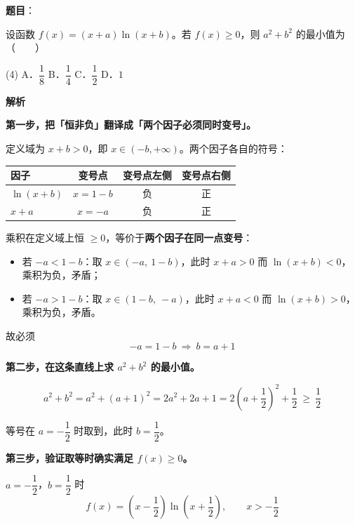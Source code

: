 \begin{answer}

\textbf{题目}：

设函数 $f(x)=(x+a)\ln(x+b)$。若 $f(x)\ge0$，则 $a^{2}+b^{2}$ 的最小值为\mbox{（　　）}

\begin{gkopts}(4)
\task A．$\dfrac18$
\task B．$\dfrac14$
\task C．$\dfrac12$
\task D．$1$
\end{gkopts}

\textbf{解析}

\textbf{第一步，把「恒非负」翻译成「两个因子必须同时变号」。}

定义域为 $x+b>0$，即 $x\in(-b,+\infty)$。两个因子各自的符号：

\begin{center}
\begin{tabular}{lccc}
\toprule
因子 & 变号点 & 变号点左侧 & 变号点右侧 \\
\midrule
$\ln(x+b)$ & $x=1-b$ & 负 & 正 \\
$x+a$ & $x=-a$ & 负 & 正 \\
\bottomrule
\end{tabular}
\end{center}

乘积在定义域上恒 $\ge0$，等价于\textbf{两个因子在同一点变号}：

\begin{itemize}
\item 若 $-a<1-b$：取 $x\in(-a,\ 1-b)$，此时 $x+a>0$ 而 $\ln(x+b)<0$，乘积为负，矛盾；
\item 若 $-a>1-b$：取 $x\in(1-b,\ -a)$，此时 $x+a<0$ 而 $\ln(x+b)>0$，乘积为负，矛盾。
\end{itemize}

故必须
\nopagebreak[4]
\[-a=1-b\ \Longrightarrow\ \boxed{b=a+1}\]

\textbf{第二步，在这条直线上求 $a^{2}+b^{2}$ 的最小值。}

\nopagebreak[4]
\[a^{2}+b^{2}=a^{2}+(a+1)^{2}=2a^{2}+2a+1=2\left(a+\frac12\right)^{2}+\frac12\ \ge\ \frac12\]

等号在 $a=-\dfrac12$ 时取到，此时 $b=\dfrac12$。

\textbf{第三步，验证取等时确实满足 $f(x)\ge0$。}

$a=-\dfrac12$，$b=\dfrac12$ 时
\nopagebreak[4]
\[f(x)=\left(x-\frac12\right)\ln\left(x+\frac12\right),\qquad x>-\frac12\]


\end{answer}
